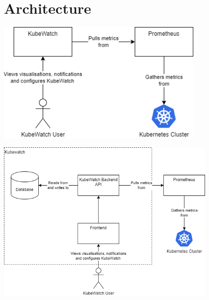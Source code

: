 \chapter{Architecture}

    


\includegraphics[height=6cm]{resources/System_context_diagram.png} \newline

\includegraphics[height=8cm]{resources/Container_diagram.png}


